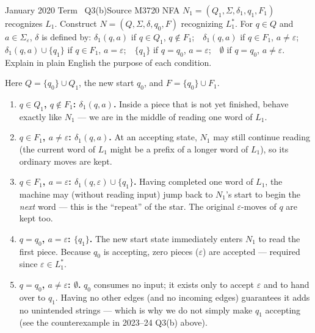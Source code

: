 \documentclass[11pt,a4paper]{article}
\newcommand{\eps}{\varepsilon}
\begin{document}
\begin{question}{January 2020 Term \textbullet\ Q3(b)}{Source M37}{20}
NFA $N_1=(Q_1,\Sigma,\delta_1,q_1,F_1)$ recognizes $L_1$. Construct $N=(Q,\Sigma,\delta,q_0,F)$ recognizing $L_1^*$. For $q\in Q$ and $a\in\Sigma_\eps$, $\delta$ is defined by:
$\delta_1(q,a)$ if $q\in Q_1$, $q\notin F_1$;\ \
$\delta_1(q,a)$ if $q\in F_1$, $a\neq\eps$;\ \
$\delta_1(q,a)\cup\{q_1\}$ if $q\in F_1$, $a=\eps$;\ \
$\{q_1\}$ if $q=q_0$, $a=\eps$;\ \
$\emptyset$ if $q=q_0$, $a\neq\eps$.
Explain in plain English the purpose of each condition.
\end{question}
\begin{solution}
Here $Q=\{q_0\}\cup Q_1$, the new start $q_0$, and $F=\{q_0\}\cup F_1$.
\begin{enumerate}
\item \textbf{$q\in Q_1$, $q\notin F_1$: $\delta_1(q,a)$.} Inside a piece that is not yet finished, behave exactly like $N_1$ --- we are in the middle of reading one word of $L_1$.
\item \textbf{$q\in F_1$, $a\neq\eps$: $\delta_1(q,a)$.} At an accepting state, $N_1$ may still continue reading (the current word of $L_1$ might be a prefix of a longer word of $L_1$), so its ordinary moves are kept.
\item \textbf{$q\in F_1$, $a=\eps$: $\delta_1(q,\eps)\cup\{q_1\}$.} Having completed one word of $L_1$, the machine may (without reading input) jump back to $N_1$'s start to begin the \emph{next} word --- this is the ``repeat'' of the star. The original $\eps$-moves of $q$ are kept too.
\item \textbf{$q=q_0$, $a=\eps$: $\{q_1\}$.} The new start state immediately enters $N_1$ to read the first piece. Because $q_0$ is accepting, zero pieces ($\eps$) are accepted --- required since $\eps\in L_1^*$.
\item \textbf{$q=q_0$, $a\neq\eps$: $\emptyset$.} $q_0$ consumes no input; it exists only to accept $\eps$ and to hand over to $q_1$. Having no other edges (and no incoming edges) guarantees it adds no unintended strings --- which is why we do not simply make $q_1$ accepting (see the counterexample in 2023--24 Q3(b) above).
\end{enumerate}
\end{solution}
\end{document}

